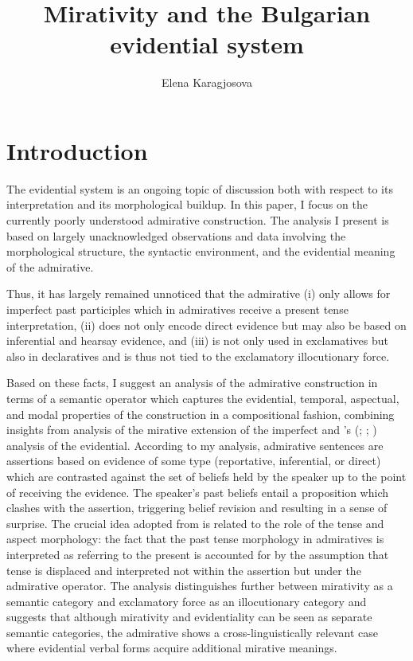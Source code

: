 \documentclass[output=paper,
colorlinks,
citecolor=brown,
newtxmath
]{langscibook}
\author{Elena Karagjosova\affiliation{Freie Universität Berlin}}
\title{Mirativity and the Bulgarian evidential system}
\begin{document}
\maketitle

\section{Introduction}\label{sec:intro}

The  evidential system is an ongoing topic of discussion both with respect to its interpretation and its morphological buildup. In this paper, I focus on the currently poorly understood admirative construction. The analysis I present is based on largely unacknowledged observations and data involving the morphological structure, the syntactic environment, and the evidential meaning of the admirative.

Thus, it has largely remained unnoticed that the admirative (i) only allows for imperfect past participles which in admiratives receive a present tense interpretation, (ii) does not only encode direct evidence but may also be based on inferential and hearsay evidence, and (iii) is not only used in exclamatives but also in declaratives and is thus not tied to the exclamatory illocutionary force.

Based on these facts, I suggest an analysis of the admirative construction in terms of a semantic operator which captures the evidential, temporal, aspectual, and modal properties of the construction in a compositional fashion, combining insights from  analysis of the mirative extension of the  imperfect and \citeauthor{Smirnova2011a}'s (\citeyear{Smirnova2011a}; \citeyear{Smirnova2011b}; \citeyear{Smirnova2013}) analysis of the  evidential. According to my analysis, admirative sentences are assertions based on evidence of some type (reportative, inferential, or direct) which are contrasted against the set of beliefs held by the speaker up to the point of receiving the evidence. The speaker's past beliefs entail a proposition which clashes with the assertion, triggering belief revision and resulting in a sense of surprise.
The crucial idea adopted from \citeauthor{Bustamante2013} is related to the role of the tense and aspect morphology: the fact that the past tense morphology in admiratives is interpreted as referring to the present is accounted for by the assumption that tense is displaced and interpreted not within the assertion but under the admirative operator.
The analysis distinguishes further between mirativity as a semantic category and exclamatory force as an illocutionary category and suggests that although mirativity and evidentiality can be seen as separate semantic categories, the  admirative shows a cross-linguistically relevant case where evidential verbal forms acquire additional mirative meanings.
\end{document}
